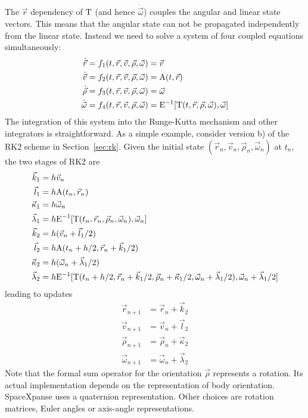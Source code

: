 \documentclass[a4paper]{article}
\begin{document}
The $\vec{r}$ dependency of $\mathrm{T}$ (and hence $\dot{\vec\omega}$) couples the angular and linear state vectors. This means that the angular state can not be propagated independently from the linear state. Instead we need to solve a system of four coupled equations simultaneously:
\begin{equation}
\begin{split}
\dot{\vec{r}} &= f_1(t,\vec{r},\vec{v},\vec\rho,\vec\omega) = \vec{v} \\
\dot{\vec{v}} &= f_2(t,\vec{r},\vec{v},\vec\rho,\vec\omega) = \mathrm{A}(t,\vec{r}) \\
\dot{\vec{\rho}} &= f_3(t,\vec{r},\vec{v},\vec\rho,\vec\omega) = \vec\omega \\
\dot{\vec{\omega}} &= f_4(t,\vec{r},\vec{v},\vec\rho,\vec\omega) = \mathrm{E}^{-1}[\mathrm{T}(t,\vec{r},\vec\rho,\vec\omega),\vec\omega]
\end{split}
\end{equation}
The integration of this system into the Runge-Kutta mechanism and other integrators is straightforward. As a simple example, consider version b) of the RK2 scheme in Section~\ref{sec:rk}.
Given the initial state $(\vec{r}_n, \vec{v}_n, \vec\rho_n, \vec\omega_n)$ at $t_n$,
the two stages of RK2 are
\begin{equation}
\begin{split}
\vec{k}_1 &= h\vec{v}_n \\
\vec{l}_1 &= h\mathrm{A}(t_n, \vec{r}_n) \\
\vec{\kappa}_1 &= h\vec\omega_n \\
\vec{\lambda}_1 &= h \mathrm{E}^{-1}[\mathrm{T}(t_n,\vec{r}_n,\vec\rho_n,\vec\omega_n),\vec\omega_n] \\
\vec{k}_2 &= h(\vec{v}_n+\vec{l}_1/2) \\
\vec{l}_2 &= h\mathrm{A}(t_n+h/2, \vec{r}_n+\vec{k}_1/2) \\
\vec\kappa_2 &= h(\vec\omega_n + \vec{\lambda}_1/2) \\
\vec\lambda_2 &= h\mathrm{E}^{-1}[\mathrm{T}(t_n+h/2,\vec{r}_n+\vec{k}_1/2,\vec\rho_n+\vec\kappa_1/2,\vec\omega_n+\vec\lambda_1/2),\vec\omega_n+\vec\lambda_1/2]
\end{split}
\end{equation}
leading to updates
\begin{equation}
\begin{split}
\vec{r}_{n+1} &= \vec{r}_n + \vec{k}_2 \\
\vec{v}_{n+1} &= \vec{v}_n + \vec{l}_2 \\
\vec\rho_{n+1} &= \vec\rho_n + \vec\kappa_2 \\
\vec\omega_{n+1} &= \vec\omega_n + \vec\lambda_2
\end{split}
\end{equation}
Note that the formal sum operator for the orientation $\vec\rho$ represents a rotation. Its actual implementation depends on the representation of body orientation. SpaceXpanse uses a quaternion representation. Other choices are rotation matrices, Euler angles or axis-angle representations.
\end{document}
